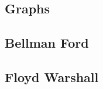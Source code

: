 \documentclass[12pt]{extarticle}
\begin{document}
\begin{multicols*}{2}
% 

% 

\section{Graphs}

% 

% 

\subsection{Bellman Ford}


% 

\subsection{Floyd Warshall}


% 

% 


\end{multicols*}
\end{document}
